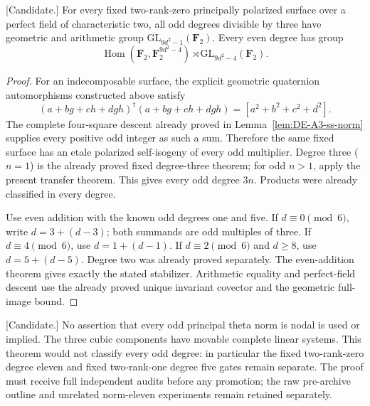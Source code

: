 \begin{corollary}
\label{cor:f0-all-even-nine-theta-transfer-candidate}
\textup{[Candidate.]}
For every fixed two-rank-zero principally polarized surface over
a perfect field of characteristic two, all odd degrees divisible
by three have geometric and arithmetic group
$\mathrm{GL}_{9d^2-1}(\mathbf F_2)$. Every even degree has group
\[
 \operatorname{Hom}(\mathbf F_2,\mathbf F_2^{9d^2-4})\rtimes
            \mathrm{GL}_{9d^2-4}(\mathbf F_2).
\]
\end{corollary}

\begin{proof}
For an indecomposable surface, the explicit geometric quaternion
automorphisms constructed above satisfy
\[
 (a+bg+ch+dgh)^\dagger(a+bg+ch+dgh)
                         =[a^2+b^2+c^2+d^2].
\]
The complete four-square descent already proved in
Lemma~\ref{lem:DE-A3-ss-norm} supplies every positive odd integer
as such a sum. Therefore the same fixed surface has an etale
polarized self-isogeny of every odd multiplier. Degree three
($n=1$) is the already proved fixed degree-three theorem; for
odd $n>1$, apply the present transfer theorem. This gives every
odd degree $3n$. Products were already classified in every degree.

Use even addition with the known odd degrees one and five.
If $d\equiv0\pmod6$, write $d=3+(d-3)$; both summands are odd
multiples of three. If $d\equiv4\pmod6$, use $d=1+(d-1)$.
If $d\equiv2\pmod6$ and $d\ge8$, use $d=5+(d-5)$.
Degree two was already proved separately. The even-addition
theorem gives exactly the stated stabilizer. Arithmetic equality
and perfect-field descent use the already proved unique invariant
covector and the geometric full-image bound.
\end{proof}

\begin{remark}[Scope]
\label{rem:nine-theta-transfer-scope-candidate}
\textup{[Candidate.]}
No assertion that every odd principal theta norm is nodal is used
or implied. The three cubic components have movable complete
linear systems. This theorem would not classify every odd degree:
in particular the fixed two-rank-zero degree eleven and fixed
two-rank-one degree five gates remain separate. The proof must
receive full independent audits before any promotion; the raw
pre-archive outline and unrelated norm-eleven experiments remain
retained separately.
\end{remark}
